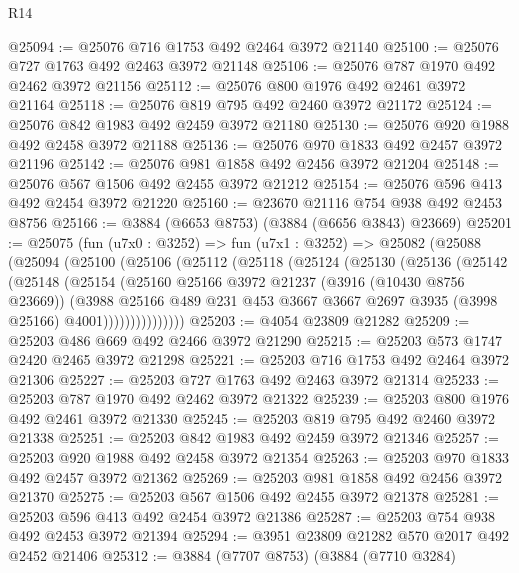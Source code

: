 \begin{lexlean}{R14}
\begin{coremodule}
@25094 := @25076 @716 @1753 @492 @2464 @3972 @21140
@25100 := @25076 @727 @1763 @492 @2463 @3972 @21148
@25106 := @25076 @787 @1970 @492 @2462 @3972 @21156
@25112 := @25076 @800 @1976 @492 @2461 @3972 @21164
@25118 := @25076 @819 @795 @492 @2460 @3972 @21172
@25124 := @25076 @842 @1983 @492 @2459 @3972 @21180
@25130 := @25076 @920 @1988 @492 @2458 @3972 @21188
@25136 := @25076 @970 @1833 @492 @2457 @3972 @21196
@25142 := @25076 @981 @1858 @492 @2456 @3972 @21204
@25148 := @25076 @567 @1506 @492 @2455 @3972 @21212
@25154 := @25076 @596 @413 @492 @2454 @3972 @21220
@25160 := @23670 @21116 @754 @938 @492 @2453 @8756
@25166 := @3884 (@6653 @8753) (@3884 (@6656 @3843) @23669)
@25201 := @25075
    (fun (u7x0 : @3252) =>
    fun (u7x1 : @3252) =>
    @25082
      (@25088
        (@25094
          (@25100
            (@25106
              (@25112
                (@25118
                  (@25124
                    (@25130
                      (@25136
                        (@25142
                          (@25148
                            (@25154
                              (@25160
                                @25166
                                @3972
                                @21237
                                (@3916 (@10430 @8756 @23669))
                                (@3988
                                  @25166
                                  @489
                                  @231
                                  @453
                                  @3667
                                  @3667
                                  @2697
                                  @3935
                                  (@3998 @25166)
                                  @4001)))))))))))))))
@25203 := @4054 @23809 @21282
@25209 := @25203 @486 @669 @492 @2466 @3972 @21290
@25215 := @25203 @573 @1747 @2420 @2465 @3972 @21298
@25221 := @25203 @716 @1753 @492 @2464 @3972 @21306
@25227 := @25203 @727 @1763 @492 @2463 @3972 @21314
@25233 := @25203 @787 @1970 @492 @2462 @3972 @21322
@25239 := @25203 @800 @1976 @492 @2461 @3972 @21330
@25245 := @25203 @819 @795 @492 @2460 @3972 @21338
@25251 := @25203 @842 @1983 @492 @2459 @3972 @21346
@25257 := @25203 @920 @1988 @492 @2458 @3972 @21354
@25263 := @25203 @970 @1833 @492 @2457 @3972 @21362
@25269 := @25203 @981 @1858 @492 @2456 @3972 @21370
@25275 := @25203 @567 @1506 @492 @2455 @3972 @21378
@25281 := @25203 @596 @413 @492 @2454 @3972 @21386
@25287 := @25203 @754 @938 @492 @2453 @3972 @21394
@25294 := @3951 @23809 @21282 @570 @2017 @492 @2452 @21406
@25312 := @3884
    (@7707 @8753)
    (@3884
      (@7710 @3284)

\end{coremodule}
\end{lexlean}
